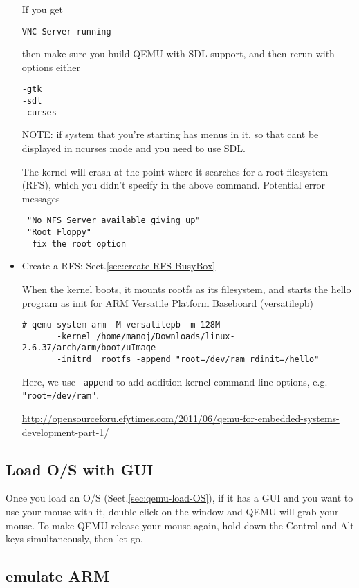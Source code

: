 \begin{itemize}
If you get 
\begin{verbatim}
VNC Server running
\end{verbatim}
then make sure you build QEMU with SDL support, and then rerun with options
either
\begin{verbatim}
-gtk
-sdl
-curses	
\end{verbatim}
NOTE:  if system that you're starting has menus in it, so that cant be displayed
in ncurses mode and you need to use SDL.


The kernel will crash at the point where it searches for a root filesystem
(RFS), which you didn't specify in the above command. Potential error messages
\begin{verbatim}
 "No NFS Server available giving up"
 "Root Floppy"
  fix the root option
\end{verbatim}

   \item Create a RFS: Sect.\ref{sec:create-RFS-BusyBox}

When the kernel boots, it mounts rootfs as its filesystem, and starts the hello
   program as init for ARM Versatile Platform Baseboard (versatilepb)
\begin{verbatim}
# qemu-system-arm -M versatilepb -m 128M 
       -kernel /home/manoj/Downloads/linux-2.6.37/arch/arm/boot/uImage 
       -initrd  rootfs -append "root=/dev/ram rdinit=/hello"
\end{verbatim}   
Here, we use \verb!-append! to add addition kernel
command line options, e.g. \verb!"root=/dev/ram"!.

   \url{http://opensourceforu.efytimes.com/2011/06/qemu-for-embedded-systems-development-part-1/}
   
   
   
\end{itemize}

\subsection{Load O/S with GUI}

Once you load an O/S (Sect.\ref{sec:qemu-load-OS}), if it has a GUI and you want
to use your mouse with it, double-click on the window and QEMU will grab your
mouse. To make QEMU release your mouse again, hold down the Control and Alt keys
simultaneously, then let go.


\subsection{emulate ARM}

